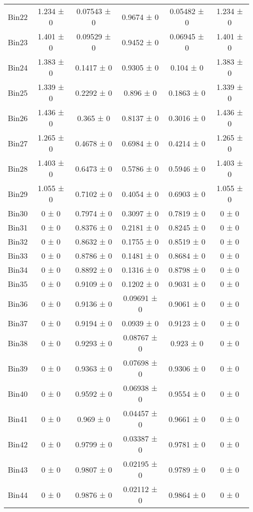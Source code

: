 \begin{tabular}{@{\extracolsep{4pt}}lccccc@{}}
     Bin22 & 1.234 ± 0 & 0.07543 ± 0 & 0.9674 ± 0 & 0.05482 ± 0 & 1.234 ± 0 \\ 
     Bin23 & 1.401 ± 0 & 0.09529 ± 0 & 0.9452 ± 0 & 0.06945 ± 0 & 1.401 ± 0 \\ 
     Bin24 & 1.383 ± 0 & 0.1417 ± 0 & 0.9305 ± 0 & 0.104 ± 0 & 1.383 ± 0 \\ 
     Bin25 & 1.339 ± 0 & 0.2292 ± 0 & 0.896 ± 0 & 0.1863 ± 0 & 1.339 ± 0 \\ 
     Bin26 & 1.436 ± 0 & 0.365 ± 0 & 0.8137 ± 0 & 0.3016 ± 0 & 1.436 ± 0 \\ 
     Bin27 & 1.265 ± 0 & 0.4678 ± 0 & 0.6984 ± 0 & 0.4214 ± 0 & 1.265 ± 0 \\ 
     Bin28 & 1.403 ± 0 & 0.6473 ± 0 & 0.5786 ± 0 & 0.5946 ± 0 & 1.403 ± 0 \\ 
     Bin29 & 1.055 ± 0 & 0.7102 ± 0 & 0.4054 ± 0 & 0.6903 ± 0 & 1.055 ± 0 \\ 
     Bin30 & 0 ± 0 & 0.7974 ± 0 & 0.3097 ± 0 & 0.7819 ± 0 & 0 ± 0 \\ 
     Bin31 & 0 ± 0 & 0.8376 ± 0 & 0.2181 ± 0 & 0.8245 ± 0 & 0 ± 0 \\ 
     Bin32 & 0 ± 0 & 0.8632 ± 0 & 0.1755 ± 0 & 0.8519 ± 0 & 0 ± 0 \\ 
     Bin33 & 0 ± 0 & 0.8786 ± 0 & 0.1481 ± 0 & 0.8684 ± 0 & 0 ± 0 \\ 
     Bin34 & 0 ± 0 & 0.8892 ± 0 & 0.1316 ± 0 & 0.8798 ± 0 & 0 ± 0 \\ 
     Bin35 & 0 ± 0 & 0.9109 ± 0 & 0.1202 ± 0 & 0.9031 ± 0 & 0 ± 0 \\ 
     Bin36 & 0 ± 0 & 0.9136 ± 0 & 0.09691 ± 0 & 0.9061 ± 0 & 0 ± 0 \\ 
     Bin37 & 0 ± 0 & 0.9194 ± 0 & 0.0939 ± 0 & 0.9123 ± 0 & 0 ± 0 \\ 
     Bin38 & 0 ± 0 & 0.9293 ± 0 & 0.08767 ± 0 & 0.923 ± 0 & 0 ± 0 \\ 
     Bin39 & 0 ± 0 & 0.9363 ± 0 & 0.07698 ± 0 & 0.9306 ± 0 & 0 ± 0 \\ 
     Bin40 & 0 ± 0 & 0.9592 ± 0 & 0.06938 ± 0 & 0.9554 ± 0 & 0 ± 0 \\ 
     Bin41 & 0 ± 0 & 0.969 ± 0 & 0.04457 ± 0 & 0.9661 ± 0 & 0 ± 0 \\ 
     Bin42 & 0 ± 0 & 0.9799 ± 0 & 0.03387 ± 0 & 0.9781 ± 0 & 0 ± 0 \\ 
     Bin43 & 0 ± 0 & 0.9807 ± 0 & 0.02195 ± 0 & 0.9789 ± 0 & 0 ± 0 \\ 
     Bin44 & 0 ± 0 & 0.9876 ± 0 & 0.02112 ± 0 & 0.9864 ± 0 & 0 ± 0 \\ 

\end{tabular}
